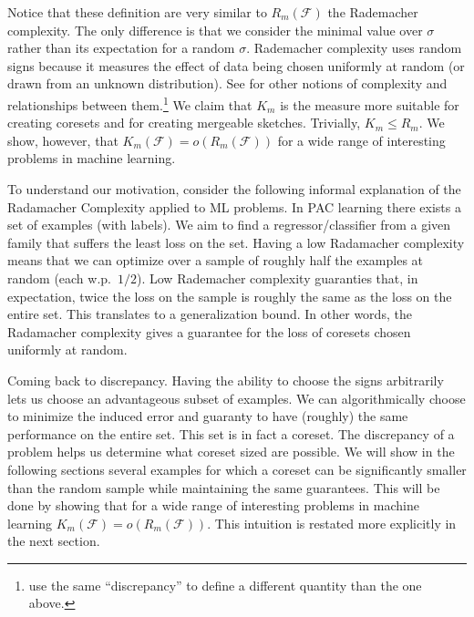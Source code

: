 \documentclass[anon,12pt]{colt2019} %
\newcommand{\F}{\mathcal{F}}
\begin{document}
\noindent Notice that these definition are very similar to $R_m(\F)$ the Rademacher complexity.
The only difference is that we consider the minimal value over $\sigma$ rather than its expectation for a random $\sigma$.
Rademacher complexity uses random signs because it measures the effect of data being chosen uniformly at random (or drawn from an unknown distribution). See \cite{Bartlett:2003:RGC:944919.944944} for other notions of complexity and relationships between them.\footnote{\cite{Bartlett:2003:RGC:944919.944944} use the same ``discrepancy'' to define a different quantity than the one above.}
 We claim that $K_m$ is the measure more suitable for creating coresets and for creating mergeable sketches.
Trivially,  $K_m \le R_m$. We show, however, that $K_m(\F) = o(R_m(\F))$ for a wide range of interesting problems in machine learning.


To understand our motivation, consider the following informal explanation of the Radamacher Complexity applied to ML problems. 
In PAC learning there exists a set of examples (with labels).
We aim to find a regressor/classifier from a given family that suffers the least loss on the set. 
Having a low Radamacher complexity means that we can optimize over a sample of roughly half the examples at random (each w.p.\ $1/2$).
Low Rademacher complexity guaranties that, in expectation, twice the loss on the sample is roughly the same as the loss on the entire set.
This translates to a generalization bound. 
In other words, the Radamacher complexity gives a guarantee for the loss of coresets chosen uniformly at random.

Coming back to discrepancy. Having the ability to choose the signs arbitrarily lets us choose an advantageous subset of examples.
We can algorithmically choose to minimize the induced error and guaranty to have (roughly) the same performance on the entire set. 
This set is in fact a coreset. The discrepancy of a problem helps us determine what coreset sized are possible. 
We will show in the following sections several examples for which a coreset can be significantly smaller than the random sample while maintaining the same guarantees. This will be done by showing that for a wide range of interesting problems in machine learning $K_m(\F) = o(R_m(\F))$.
This intuition is restated more explicitly in the next section.
\end{document}
